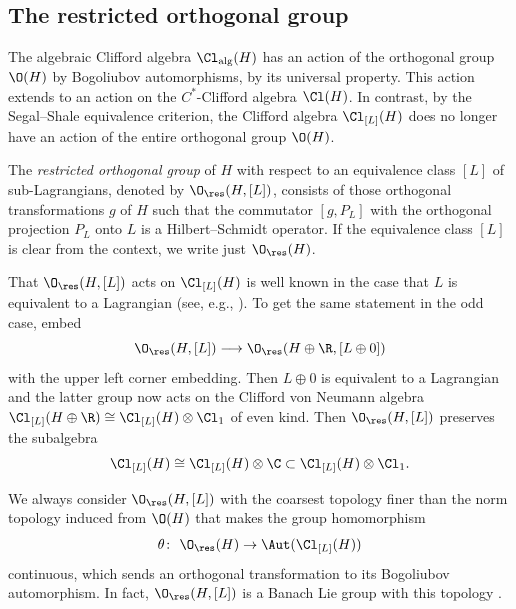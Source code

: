 \subsection{The restricted orthogonal group}

The algebraic Clifford algebra $\Cl_{\mathrm{alg}}(H)$ has an action of the orthogonal group $\O(H)$ by Bogoliubov automorphisms, by its universal property.
This action extends to an action on the $C^*$-Clifford algebra $\Cl(H)$.
In contrast, by the Segal--Shale equivalence criterion, the Clifford algebra $\Cl_{[L]}(H)$ does no longer have an action of the entire orthogonal group $\O(H)$.

\begin{Definition}
The \emph{restricted orthogonal group} of $H$ with respect to an equivalence class $[L]$ of sub-Lagrangians, denoted by $\O_{\res}(H, [L])$, consists of those orthogonal transformations $g$ of $H$ such that the commutator $[g, P_L]$ with the orthogonal projection $P_L$ onto $L$ is a Hilbert--Schmidt operator.
If the equivalence class $[L]$ is clear from the context, we write just $\O_{\res}(H)$.
\end{Definition}

That $\O_{\res}(H, [L])$ acts on $\Cl_{[L]}(H)$ is well known in the case that $L$ is equivalent to a Lagrangian (see, e.g., \cite[Section~6]{Araki1}).
To get the same statement in the odd case, embed
\begin{equation*}
\O_{\res}(H, [L]) \longrightarrow \O_{\res}(H \oplus \R, [L \oplus 0])
\end{equation*}
 with the upper left corner embedding.
 Then $L \oplus 0$ is equivalent to a Lagrangian and the latter group now acts on the Clifford von Neumann algebra $\Cl_{[L]}(H \oplus \R) \cong \Cl_{[L]}(H) \otimes \Cl_1$ of even kind.
 Then $\O_{\res}(H, [L])$ preserves the subalgebra
 \begin{equation*}
 \Cl_{[L]}(H) \cong \Cl_{[L]}(H) \otimes \C \subset \Cl_{[L]}(H)\otimes \Cl_1.
\end{equation*}

We always consider $\O_{\res}(H, [L])$ with the coarsest topology finer than the norm topology induced from $\O(H)$ that makes the group homomorphism
\begin{equation} \label{vonNeumannBogoliubovMap}
 \theta\colon\ \O_{\res}(H) \to \Aut(\Cl_{[L]}(H))
\end{equation}
continuous, which sends an orthogonal transformation to its Bogoliubov automorphism.
In fact, $\O_{\res}(H, [L])$ is a Banach Lie group with this topology \cite[Sections~6.2 and~2.4]{PressleySegal}.

